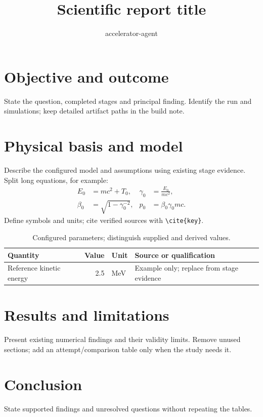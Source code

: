 \documentclass[11pt,a4paper]{article}
\title{Scientific report title}
\author{accelerator-agent}
\date{}
\begin{document}
\maketitle
\section{Objective and outcome}
State the question, completed stages and principal finding. Identify the run and
simulations; keep detailed artifact paths in the build note.

\section{Physical basis and model}
Describe the configured model and assumptions using existing stage evidence.
Split long equations, for example:
\begin{equation}
\begin{aligned}
 E_0 &= m c^2 + T_0, & \gamma_0 &= \frac{E_0}{m c^2}, \\
 \beta_0 &= \sqrt{1-\gamma_0^{-2}}, & p_0 &= \beta_0\gamma_0 m c .
\end{aligned}
\label{eq:reference}
\end{equation}
Define symbols and units; cite verified sources with \verb|\cite{key}|.

\begin{table}[htbp]
\centering
\begin{tabularx}{\linewidth}{Y r l Y}
\toprule
Quantity & Value & Unit & Source or qualification \\
\midrule
Reference kinetic energy & 2.5 & MeV & Example only; replace from stage evidence \\
\bottomrule
\end{tabularx}
\caption{Configured parameters; distinguish supplied and derived values.}
\label{tab:parameters}
\end{table}

\section{Results and limitations}
Present existing numerical findings and their validity limits. Remove unused
sections; add an attempt/comparison table only when the study needs it.

\section{Conclusion}
State supported findings and unresolved questions without repeating the tables.
% 
% 
\end{document}
